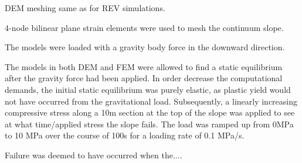 DEM meshing same as for REV simulations.

4-node bilinear plane strain elements were used to mesh the continuum slope.

The models were loaded with a gravity body force in the downward direction.

The models in both DEM and FEM were allowed to find a static equilibrium after the gravity force had been applied. In order decrease the computational demands, the initial static equilibrium was purely elastic, as plastic yield would not have occurred from the gravitational load. Subsequently, a linearly increasing compressive stress along a 10m section at the top of the slope was applied to see at what time/applied stress the slope fails. The load was ramped up from 0MPa to 10 MPa over the course of 100s for a loading rate of 0.1 MPa/s. 

Failure was deemed to have occurred when the....